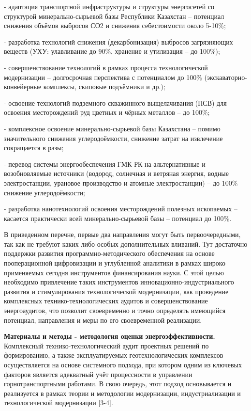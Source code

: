 - адаптация транспортной инфраструктуры и структуры энергосетей со
структурой минерально-сырьевой базы Республики Казахстан -- потенциал
снижения объёмов выбросов СО2 и снижения себестоимости около 5-10\%;

- разработка технологий снижения (декарбонизация) выбросов загрязняющих
веществ (УХУ: улавливание до 90\%, хранение и утилизация -- до 100\%);

- совершенствование технологий в рамках процесса технологической
модернизации -- долгосрочная перспектива с потенциалом до 100\%
(экскаваторно-конвейерные комплексы, скиповые подъёмники и др.);

- освоение технологий подземного скважинного выщелачивания (ПСВ) для
освоения месторождений руд цветных и чёрных металлов -- до 100\%;

- комплексное освоение минерально-сырьевой базы Казахстана -- помимо
значительного снижения углеродоёмкости, снижение затрат на извлечение
сокращается в разы;

- перевод системы энергообеспечения ГМК РК на альтернативные и
возобновляемые источники (водород, солнечная и ветряная энергия, водные
электростанции, урановое производство и атомные электростанции) -- до
100\% снижение углеродоёмкости;

- разработка нанотехнологий освоения месторождений полезных ископаемых
-- касается практически всей минерально-сырьевой базы -- потенциал до
100\%.

В приведенном перечне, первые два направления могут быть
первоочередными, так как не требуют каких-либо особых дополнительных
вливаний. Тут достаточно поддержки развития программно-методического
обеспечения на основе пооперационной цифровизации и углубленной
аналитики в рамках широко применяемых сегодня инструментов
финансирования науки. С этой целью необходимо привлечение таких
инструментов инновационно-индустриального развития и стимулирования
технологической модернизации, как проведение комплексных
технико-технологических аудитов и совершенствование энергоаудитов, что
позволит своевременно и точно определять имеющийся потенциал,
направления и меры по его своевременной реализации.

{\bfseries Материалы и методы - методология оценки энергоэффективности.}
Комплексный технико-технологический аудит проектных решений по
формированию, а также эксплуатируемых геотехнологических комплексов
осуществляется на основе системного подхода, при котором одним из
ключевых факторов является адекватный учёт процессности в управлении
горнотранспортными работами. В свою очередь, этот подход основывается и
реализуется в рамках теории и методологии модернизации, индустриализации
и технологической модернизации {[}3-4{]}.

